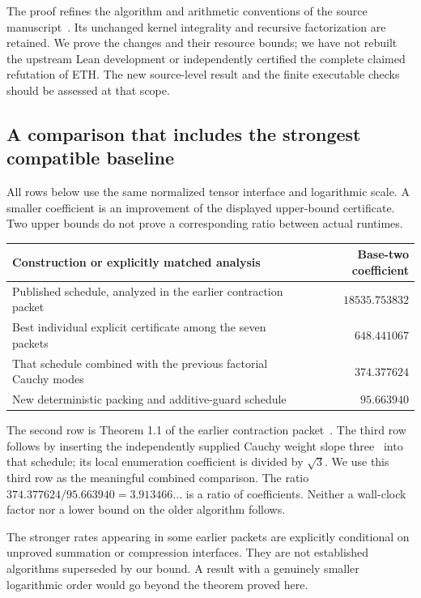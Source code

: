 \documentclass[11pt,letterpaper]{article}
\numberwithin{equation}{section}
\theoremstyle{definition}\newtheorem{definition}[theorem]{Definition}
\theoremstyle{remark}\newtheorem{remark}[theorem]{Remark}
\begin{document}
The proof refines the algorithm and arithmetic conventions of the source manuscript~\cite{source,contraction,reduction}. Its unchanged kernel integrality and recursive factorization are retained. We prove the changes and their resource bounds; we have not rebuilt the upstream Lean development or independently certified the complete claimed refutation of ETH. The new source-level result and the finite executable checks should be assessed at that scope.

\subsection{A comparison that includes the strongest compatible baseline}

All rows below use the same normalized tensor interface and logarithmic scale. A smaller coefficient is an improvement of the displayed upper-bound certificate. Two upper bounds do not prove a corresponding ratio between actual runtimes.

\begin{center}
\begin{tabularx}{\linewidth}{@{}Xr@{}}
\toprule
Construction or explicitly matched analysis & Base-two coefficient\\
\midrule
Published schedule, analyzed in the earlier contraction packet & $18535.753832$\\
Best individual explicit certificate among the seven packets & $648.441067$\\
That schedule combined with the previous factorial Cauchy modes & $374.377624$\\
New deterministic packing and additive-guard schedule & $95.663940$\\
\bottomrule
\end{tabularx}
\end{center}

The second row is Theorem 1.1 of the earlier contraction packet~\cite{contractionpacket}. The third row follows by inserting the independently supplied Cauchy weight slope three~\cite{cauchypacket} into that schedule; its local enumeration coefficient is divided by $\sqrt3$. We use this third row as the meaningful combined comparison. The ratio $374.377624/95.663940=3.913466\ldots$ is a ratio of coefficients. Neither a wall-clock factor nor a lower bound on the older algorithm follows.

The stronger rates appearing in some earlier packets are explicitly conditional on unproved summation or compression interfaces. They are not established algorithms superseded by our bound. A result with a genuinely smaller logarithmic order would go beyond the theorem proved here.
\end{document}
